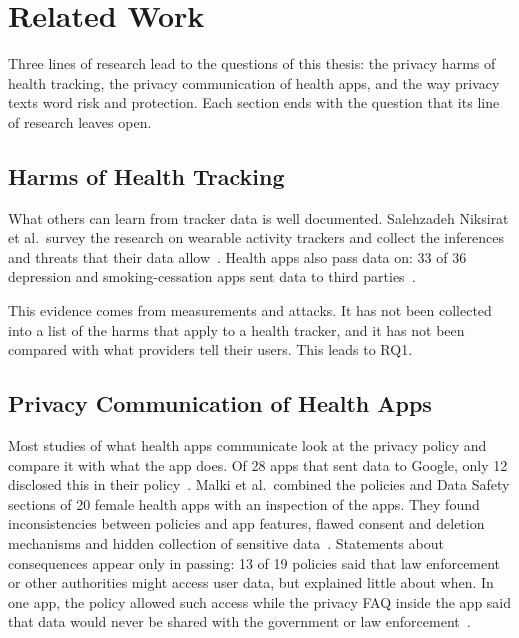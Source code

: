 \chapter{Related Work}
\label{ch:related-work}

Three lines of research lead to the questions of this thesis: the privacy
harms of health tracking, the privacy communication of health apps, and the
way privacy texts word risk and protection. Each section ends with the
question that its line of research leaves open.

\section{Harms of Health Tracking}
\label{sec:rw-harms}
What others can learn from tracker data is well documented. Salehzadeh Niksirat
et al.\ survey the research on wearable activity trackers and collect the
inferences and threats that their data
allow~\parencite{niksirat2024wearable}. Health apps also pass data on: 33 of 36
depression and smoking-cessation apps sent data to third
parties~\parencite{huckvale2019assessment}.

This evidence comes from measurements and attacks. It has not been collected
into a list of the harms that apply to a health tracker, and it has not been
compared with what providers tell their users. This leads to RQ1.

\section{Privacy Communication of Health Apps}
\label{sec:rw-communication}
Most studies of what health apps communicate look at the privacy policy and
compare it with what the app does. Of 28 apps that sent data to Google, only
12 disclosed this in their policy~\parencite{huckvale2019assessment}. Malki et
al.\ combined the policies and Data Safety sections of 20 female health apps
with an inspection of the apps. They found inconsistencies between policies
and app features, flawed consent and deletion mechanisms and hidden collection
of sensitive data~\parencite{malki2024exploring}. Statements about
consequences appear only in passing: 13 of 19 policies said that law
enforcement or other authorities might access user data, but explained little
about when. In one app, the policy allowed such access while the privacy FAQ
inside the app said that data would never be shared with the government or law
enforcement~\parencite[\S4.2.5]{malki2024exploring}.


